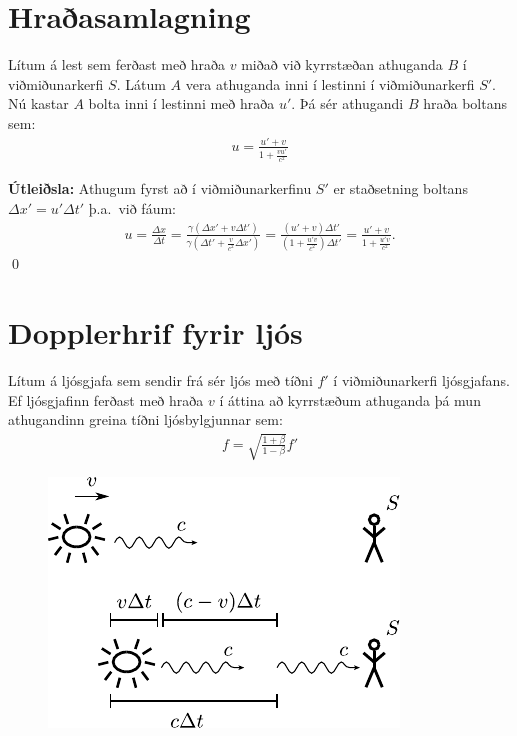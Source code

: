 \newpage

\section{Hraðasamlagning}

\begin{tcolorbox}
\begin{theorem}
Lítum á lest sem ferðast með hraða $v$ miðað við kyrrstæðan athuganda $B$ í viðmiðunarkerfi $S$. Látum $A$ vera athuganda inni í lestinni í viðmiðunarkerfi $S'$. Nú kastar $A$ bolta inni í lestinni með hraða $u'$. Þá sér athugandi $B$ hraða boltans sem:
\begin{align*}
    u = \frac{u' + v}{1 + \frac{vu'}{c^2}} 
\end{align*}
\end{theorem}
\end{tcolorbox}


\textbf{Útleiðsla:} Athugum fyrst að í viðmiðunarkerfinu $S'$ er staðsetning boltans $\Delta x' = u' \Delta t'$ þ.a.~við fáum:
\begin{align*}
    u = \frac{\Delta x}{\Delta t} = \frac{\gamma \left( \Delta x' + v\Delta t' \right)}{\gamma \left( \Delta t' + \frac{v}{c^2}\Delta x' \right)} = \frac{(u' + v)\Delta t'}{\left(1 + \frac{u'v}{c^2}\right)\Delta t'} = \frac{u' + v}{1 + \frac{u'v}{c^2}}.
\end{align*}
\qed

\section{Dopplerhrif fyrir ljós}

\begin{tcolorbox}
\begin{theorem}
Lítum á ljósgjafa sem sendir frá sér ljós með tíðni $f'$ í viðmiðunarkerfi ljósgjafans. Ef ljósgjafinn ferðast með hraða $v$ í áttina að kyrrstæðum athuganda þá mun athugandinn greina tíðni ljósbylgjunnar sem:
\begin{align*}
    f = \sqrt{\frac{1 + \beta}{1 - \beta}} f'
\end{align*}
\end{theorem}
\end{tcolorbox}

\begin{figure}[H]
    \centering
    \includegraphics{figures/dopplerhrif-ljos.pdf}
\end{figure}

